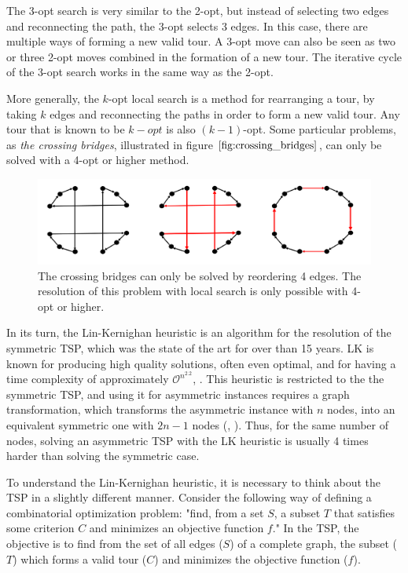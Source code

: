 The 3-opt search is very similar to the 2-opt, but instead of selecting two edges and reconnecting the path, the 3-opt selects 3 edges. In this case, there are multiple ways of forming a new valid tour. A 3-opt move can also be seen as two or three 2-opt moves combined in the formation of a new tour. The iterative cycle of the 3-opt search works in the same way as the 2-opt.

More generally, the $k$-opt local search is a method for rearranging a tour, by taking $k$ edges and reconnecting the paths in order to form a new valid tour. Any tour that is known to be $k-opt$ is also $(k-1)$-opt. Some particular problems, as \textit{the crossing bridges}, illustrated in figure $\ref{fig:crossing_bridges}$, can only be solved with a 4-opt or higher method.

\begin{figure}[htbp]
  \centering
  \includegraphics[width=.7\textwidth]{./Figures/tsp/crossing_bridges}
  \caption{The crossing bridges can only be solved by reordering 4 edges.
  The resolution of this problem with local search is only possible
  with 4-opt or higher.}
  \label{fig:crossing_bridges}
\end{figure}


In its turn, the Lin-Kernighan heuristic \cite{lkh_original} is an algorithm for the resolution of  the symmetric TSP, which was the state of the art for over than 15 years. LK is known for producing high quality solutions, often even optimal, and for having a time complexity of approximately $\mathcal{O}^{n^{2.2}}$, \cite{heuristics_tsp}. This heuristic is restricted to the  the symmetric TSP, and using it for asymmetric instances requires a graph transformation, which transforms the asymmetric instance with $n$ nodes, into an equivalent symmetric one with $2n-1$ nodes (\cite{atsp_to_tsp_1}, \cite{atsp_to_tsp_2}). Thus, for the same number of nodes, solving an asymmetric TSP with the LK heuristic is usually 4 times harder than solving the symmetric case.

To understand the Lin-Kernighan heuristic, it is necessary to think about the TSP in a slightly different manner. Consider the following way of defining a combinatorial optimization problem: "find, from a set $S$, a subset $T$ that satisfies some criterion $C$ and minimizes an objective function $f$." In the TSP, the objective is to find from the set of all edges ($S$) of a complete graph, the subset ($T$) which forms a valid tour ($C$) and minimizes the objective function ($f$). 

